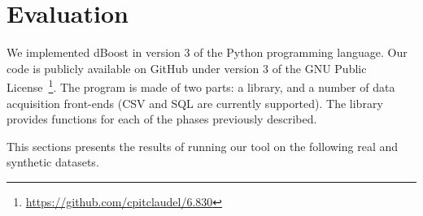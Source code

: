 \section{Evaluation}
\label{sec:evaluation}

We implemented dBoost in version 3 of the Python programming language. Our code is publicly available on GitHub under version 3 of the GNU Public License~\footnote{\url{https://github.com/cpitclaudel/6.830}}. The program is made of two parts: a library, and a number of data acquisition front-ends (CSV and SQL are currently supported). The library provides functions for each of the phases previously described.



%

This sections presents the results of running our tool on the following real and synthetic datasets.


